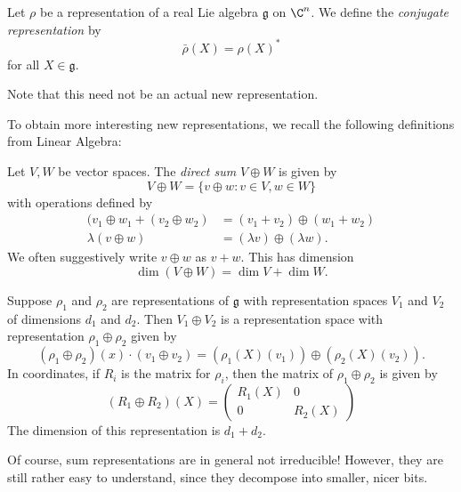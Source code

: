 \documentclass[a4paper]{article}
\begin{document}
\begin{defi}
  Let $\rho$ be a representation of a real Lie algebra $\mathfrak{g}$ on $\C^n$. We define the \emph{conjugate representation} by
  \[
    \bar{\rho}(X) = \rho(X)^*
  \]
  for all $X \in \mathfrak{g}$.
\end{defi}
Note that this need not be an actual new representation.

To obtain more interesting new representations, we recall the following definitions from Linear Algebra:
\begin{defi}
  Let $V, W$ be vector spaces. The \emph{direct sum} $V \oplus W$ is given by
  \[
    V \oplus W = \{v \oplus w: v \in V, w \in W\}
  \]
  with operations defined by
  \begin{align*}
    (v_1 \oplus w_1 + (v_2 \oplus w_2) &= (v_1 + v_2) \oplus (w_1 + w_2)\\
    \lambda(v \oplus w) &= (\lambda v) \oplus (\lambda w).
  \end{align*}
  We often suggestively write $v \oplus w$ as $v + w$. This has dimension
  \[
    \dim(V \oplus W) = \dim V + \dim W.
  \]
\end{defi}

\begin{defi}
  Suppose $\rho_1$ and $\rho_2$ are representations of $\mathfrak{g}$ with representation spaces $V_1$ and $V_2$ of dimensions $d_1$ and $d_2$. Then $V_1 \oplus V_2$ is a representation space with representation $\rho_1 \oplus \rho_2$ given by
  \[
    (\rho_1 \oplus \rho_2)(x) \cdot (v_1 \oplus v_2) = (\rho_1(X)(v_1)) \oplus (\rho_2(X)(v_2)).
  \]
  In coordinates, if $R_i$ is the matrix for $\rho_i$, then the matrix of $\rho_1 \oplus \rho_2$ is given by
  \[
    (R_1 \oplus R_2)(X) =
    \begin{pmatrix}
      R_1(X) & 0\\
      0 & R_2(X)
    \end{pmatrix}
  \]
  The dimension of this representation is $d_1 + d_2$.
\end{defi}
Of course, sum representations are in general not irreducible! However, they are still rather easy to understand, since they decompose into smaller, nicer bits.
\end{document}
